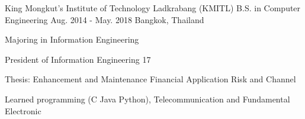 

\begin{cventries}

    \cventry
    {King Mongkut's Institute of Technology Ladkrabang (KMITL)} %
    {B.S. in Computer Engineering} %
    {Aug. 2014 - May. 2018} %
    {Bangkok, Thailand} %
    {
    \begin{cvitems} %
        \item {Majoring in Information Engineering}
        \item {President of Information Engineering 17}
        \item {Thesis: Enhancement and Maintenance Financial Application Risk and Channel}
        \item {Learned programming (C Java Python), Telecommunication and Fundamental Electronic}
    \end{cvitems}
    }

\end{cventries}

